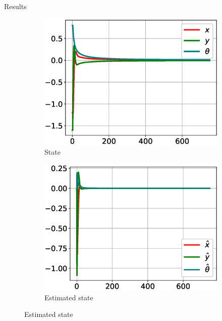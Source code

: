 \documentclass[10pt, xcolor={usenames, dvipsnames}]{beamer}
\begin{document}
        \begin{frame}{Results}
            \centering
            \begin{minipage}{.65\textwidth}
                \begin{figure}
                    \begin{subfigure}{.48\textwidth}
                        \centering
                        \includegraphics[width=\textwidth]{imgs/state}
                        \caption{State}
                    \end{subfigure}
                    \begin{subfigure}{.48\textwidth}
                        \centering
                        \includegraphics[width=\textwidth]{imgs/estimated_state}
                        \caption{Estimated state}

\end{subfigure}
\end{figure}
\end{minipage}
\end{frame}
\end{document}
